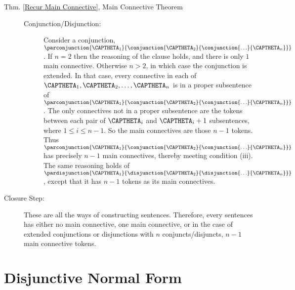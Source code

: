 \begin{PROOFOF}{Thm. \ref{Recur Main Connective}, Main Connective Theorem}
\begin{description}
\begin{description}
\item[Conjunction/Disjunction:] Consider a conjunction, $\parconjunction{\CAPTHETA_1}{\conjunction{\CAPTHETA_2}{\conjunction{\ldots}{\CAPTHETA_{\integer{n}}}}}$. If $n=2$ then the reasoning of the  clause holds, and there is only $1$ main connective. Otherwise $n>2$, in which case the conjunction is extended.
In that case, every connective in each of $\CAPTHETA_1,\CAPTHETA_2,\ldots,\CAPTHETA_n$ is in a proper subsentence of $\parconjunction{\CAPTHETA_1}{\conjunction{\CAPTHETA_2}{\conjunction{\ldots}{\CAPTHETA_{\integer{n}}}}}$.
The only connectives not in a proper subsentence are the \mention{$\WEDGE$} tokens between each pair of $\CAPTHETA_i$ and $\CAPTHETA_i+1$ subsentences, where $1\leq i\leq n-1$.
So the main connectives are those $n-1$ \mention{$\WEDGE$} tokens.
Thus $\parconjunction{\CAPTHETA_1}{\conjunction{\CAPTHETA_2}{\conjunction{\ldots}{\CAPTHETA_{\integer{n}}}}}$ has precisely $n-1$ main connectives, thereby meeting condition (iii).
The same reasoning holds of $\pardisjunction{\CAPTHETA_1}{\disjunction{\CAPTHETA_2}{\disjunction{\ldots}{\CAPTHETA_{\integer{n}}}}}$, except that it has $n-1$ \mention{$\VEE$} tokens as its main connectives.

\end{description}

\item[Closure Step:] These are all the ways of constructing \GSL{} sentences. Therefore, every \GSL{} sentences has either no main connective, one main connective, or in the case of extended conjunctions or disjunctions with $n$ conjuncts/disjuncts, $n-1$ main connective tokens.

\end{description}
\end{PROOFOF}

\section[Disjunctive Normal Form]{Disjunctive Normal Form}\label{DNF and the TFE Replacement Theorem}


